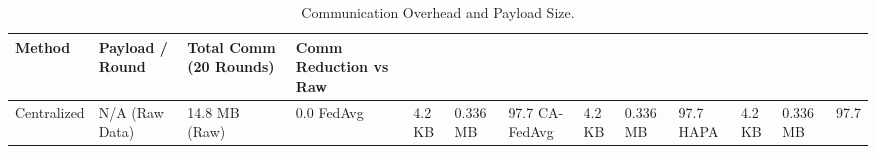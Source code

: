 \begin{table}
\caption{Communication Overhead and Payload Size.}
\label{tab:table5}
\begin{tabular}{llll}
\toprule
Method & Payload / Round & Total Comm (20 Rounds) & Comm Reduction vs Raw \\
\midrule
Centralized & N/A (Raw Data) & 14.8 MB (Raw) & 0.0%
FedAvg & 4.2 KB & 0.336 MB & 97.7%
CA-FedAvg & 4.2 KB & 0.336 MB & 97.7%
HAPA & 4.2 KB & 0.336 MB & 97.7%
\bottomrule
\end{tabular}
\end{table}
